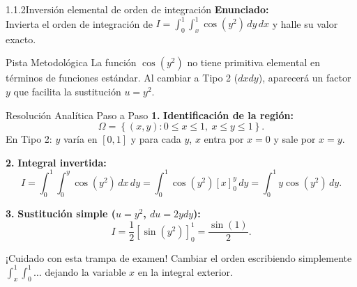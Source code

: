 \documentclass[11pt,a4paper]{article}
\begin{document}
\begin{nivelbox}{1.1.2}{Inversión elemental de orden de integración}
\textbf{Enunciado:}\\
Invierta el orden de integración de $I = \int_0^1 \int_x^1 \cos(y^2) \, dy \, dx$ y halle su valor exacto.

\begin{observacionbox}{Pista Metodológica}
La función $\cos(y^2)$ no tiene primitiva elemental en términos de funciones estándar. Al cambiar a Tipo 2 ($dx dy$), aparecerá un factor $y$ que facilita la sustitución $u = y^2$.
\end{observacionbox}

\begin{ejerciciobox}{Resolución Analítica Paso a Paso}
\smallskip\noindent\textbf{1.} \textbf{Identificación de la región:}
\[\Omega = \left\{ (x,y) : 0 \le x \le 1, \ x \le y \le 1 \right\}.\]
En Tipo 2: $y$ varía en $[0, 1]$ y para cada $y$, $x$ entra por $x = 0$ y sale por $x = y$.

\smallskip\noindent\textbf{2.} \textbf{Integral invertida:}
\[I = \int_0^1 \int_0^y \cos(y^2) \, dx \, dy = \int_0^1 \cos(y^2) [x]_0^y \, dy = \int_0^1 y \cos(y^2) \, dy.\]

\smallskip\noindent\textbf{3.} \textbf{Sustitución simple ($u = y^2$, $du = 2y dy$):}
\[I = \frac{1}{2} [\sin(y^2)]_0^1 = \frac{\sin(1)}{2}.\]
\end{ejerciciobox}

\begin{errorbox}{¡Cuidado con esta trampa de examen!}
Cambiar el orden escribiendo simplemente $\int_x^1 \int_0^1 \dots$ dejando la variable $x$ en la integral exterior.
\end{errorbox}
\end{nivelbox}
\bigskip
\end{document}
